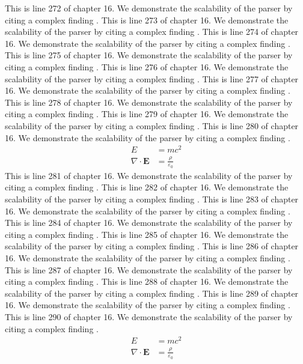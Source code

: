 This is line 272 of chapter 16. We demonstrate the scalability of the parser by citing a complex finding \cite{ref16_272}.
This is line 273 of chapter 16. We demonstrate the scalability of the parser by citing a complex finding \cite{ref16_273}.
This is line 274 of chapter 16. We demonstrate the scalability of the parser by citing a complex finding \cite{ref16_274}.
This is line 275 of chapter 16. We demonstrate the scalability of the parser by citing a complex finding \cite{ref16_275}.
This is line 276 of chapter 16. We demonstrate the scalability of the parser by citing a complex finding \cite{ref16_276}.
This is line 277 of chapter 16. We demonstrate the scalability of the parser by citing a complex finding \cite{ref16_277}.
This is line 278 of chapter 16. We demonstrate the scalability of the parser by citing a complex finding \cite{ref16_278}.
This is line 279 of chapter 16. We demonstrate the scalability of the parser by citing a complex finding \cite{ref16_279}.
This is line 280 of chapter 16. We demonstrate the scalability of the parser by citing a complex finding \cite{ref16_280}.
\begin{align*}
  E &= mc^2 \\
  \nabla \cdot \mathbf{E} &= \frac{\rho}{\varepsilon_0}
\end{align*}
This is line 281 of chapter 16. We demonstrate the scalability of the parser by citing a complex finding \cite{ref16_281}.
This is line 282 of chapter 16. We demonstrate the scalability of the parser by citing a complex finding \cite{ref16_282}.
This is line 283 of chapter 16. We demonstrate the scalability of the parser by citing a complex finding \cite{ref16_283}.
This is line 284 of chapter 16. We demonstrate the scalability of the parser by citing a complex finding \cite{ref16_284}.
This is line 285 of chapter 16. We demonstrate the scalability of the parser by citing a complex finding \cite{ref16_285}.
This is line 286 of chapter 16. We demonstrate the scalability of the parser by citing a complex finding \cite{ref16_286}.
This is line 287 of chapter 16. We demonstrate the scalability of the parser by citing a complex finding \cite{ref16_287}.
This is line 288 of chapter 16. We demonstrate the scalability of the parser by citing a complex finding \cite{ref16_288}.
This is line 289 of chapter 16. We demonstrate the scalability of the parser by citing a complex finding \cite{ref16_289}.
This is line 290 of chapter 16. We demonstrate the scalability of the parser by citing a complex finding \cite{ref16_290}.
\begin{align*}
  E &= mc^2 \\
  \nabla \cdot \mathbf{E} &= \frac{\rho}{\varepsilon_0}
\end{align*}
